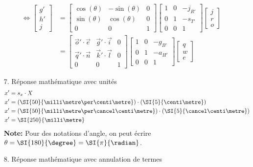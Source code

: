 \documentclass{gif7001}
\begin{document}
\begin{enumerate}
\begin{align*}
        \Leftrightarrow \begin{bmatrix}g'\\h'\\j\end{bmatrix} &= \begin{bmatrix}\cos(\theta)&-\sin(\theta)&0\\\sin(\theta)&\cos(\theta)&0\\0&0&1\end{bmatrix} \begin{bmatrix}1&0&-j_{R'}\\0&1&-s_{T'}\\0&0&1\end{bmatrix} \begin{bmatrix}j\\r\\o\end{bmatrix} \\
        &= \begin{bmatrix}\vec{o}'\cdot\vec{e}&\vec{g}'\cdot\vec{i}&0\\\vec{q}'\cdot\vec{n}&\vec{k}'\cdot\vec{l}&0\\0&0&1\end{bmatrix} \begin{bmatrix}1&0&-g_{B'}\\0&1&-a_{H'}\\0&0&1\end{bmatrix} \begin{bmatrix}q\\w\\e\end{bmatrix}
    \end{align*}
    \item[7.] Réponse mathématique avec unités
    \begin{align*}
        x' &= s_x \cdot X\\
        x' &= \left( \SI{50}{\milli\metre\per\centi\metre} \right) \cdot \left(\SI{5}{\centi\metre}\right) \\
        x' &= \left( \SI{50}{\milli\metre\per\cancel\centi\metre} \right) \cdot \left(\SI{5}{\cancel\centi\metre}\right) \\
        x' &= \SI{250}{\milli\metre}
    \end{align*}
    \textbf{Note: } Pour des notations d'angle, on peut écrire \(\theta = \SI{180}{\degree} = \SI{\pi}{\radian}\).
    \item[8.] Réponse mathématique avec annulation de termes
    \begin{align*}

\end{align*}
\end{enumerate}
\end{document}
